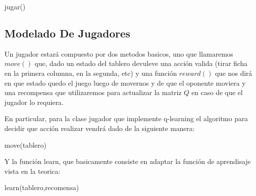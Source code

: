 \begin{algorithm}[h!]
\begin{algorithmic}[1]\parskip=1mm
 \caption{jugar()}
\end{algorithmic}
\end{algorithm}


\subsection{Modelado De Jugadores}

Un jugador estará compuesto por dos metodos basicos, uno que llamaremos $move()$ que, dado un estado del tablero devuleve una acción valida (tirar ficha en la primera columna, en la segunda, etc) y una función $reward()$ que nos dirá en que estado quedo el juego luego de movernos y de que el oponente moviera y una recompensa que utilizaremos para actualizar la matriz $Q$ en caso de que el jugador lo requiera.

En particular, para la clase jugador que implemente q-learning el algoritmo para decidir que acción realizar vendrá dado de la siguiente manera:

\begin{algorithm}[h!]
\begin{algorithmic}[1]\parskip=1mm
 \caption{move(tablero)}
\end{algorithmic}
\end{algorithm}

Y la función learn, que basicamente consiste en adaptar la función de aprendisaje vista en la teorica:

\begin{algorithm}[h!]
\begin{algorithmic}[1]\parskip=1mm
 \caption{learn(tablero,recomensa)}
\end{algorithmic}
\end{algorithm}

